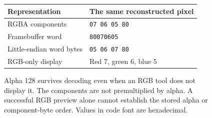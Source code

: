 \begin{figure}[htbp]
  \centering
  \begin{tabular}{l l}
    \toprule
    Representation           & The same reconstructed pixel \\
    \midrule
    RGBA components          & \texttt{07 06 05 80}         \\
    Framebuffer word         & \texttt{80070605}            \\
    Little-endian word bytes & \texttt{05 06 07 80}         \\
    RGB-only display         & Red 7, green 6, blue 5       \\
    \bottomrule
  \end{tabular}
  \caption{Alpha 128 survives decoding even when an RGB tool does not display it. The components are not premultiplied by alpha. A successful RGB preview alone cannot establish the stored alpha or component-byte order. Values in code font are hexadecimal.}
  \label{fig:revision-qoi-representations}
\end{figure}
